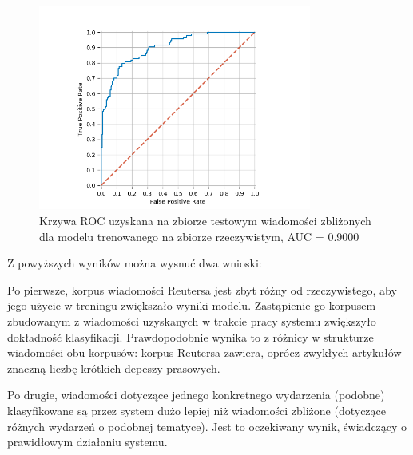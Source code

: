 \begin{figure}[p]
\centering
\includegraphics[width=0.8\textwidth]{./pict/dataset_z.png}
\caption{Krzywa ROC uzyskana na zbiorze testowym wiadomości zbliżonych dla modelu trenowanego na zbiorze rzeczywistym, AUC = 0.9000}
\label{fig:rocidentical}
\end{figure}

Z powyższych wyników można wysnuć dwa wnioski:

Po pierwsze, korpus wiadomości Reutersa jest zbyt różny od
rzeczywistego, aby jego użycie w treningu zwiększało wyniki
modelu. Zastąpienie go korpusem zbudowanym z wiadomości uzyskanych w
trakcie pracy systemu zwiększyło dokładność
klasyfikacji. Prawdopodobnie wynika to z różnicy w strukturze
wiadomości obu korpusów: korpus Reutersa zawiera, oprócz zwykłych
artykułów znaczną liczbę krótkich depeszy prasowych.

Po drugie, wiadomości dotyczące jednego konkretnego wydarzenia
(podobne) klasyfikowane są przez system dużo lepiej niż wiadomości
zbliżone (dotyczące różnych wydarzeń o podobnej tematyce). Jest to
oczekiwany wynik, świadczący o prawidłowym działaniu systemu.
